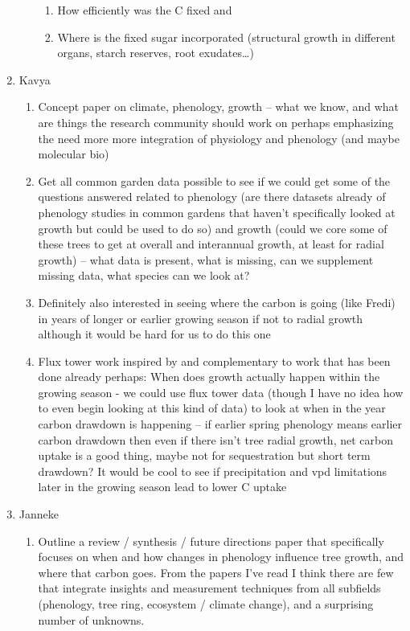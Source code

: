 \documentclass[11pt,letter]{article}
\begin{document}
\begin{enumerate}
\begin{enumerate}
\begin{enumerate}
\item  How efficiently was the C fixed and
\item  Where is the fixed sugar incorporated (structural growth in different organs, starch reserves, root exudates…)
\end{enumerate}
\end{enumerate}
\item Kavya
\begin{enumerate}
\item Concept paper on climate, phenology, growth – what we know, and what are things the research community should work on perhaps emphasizing the need more more integration of physiology and phenology (and maybe molecular bio)
\item Get all common garden data possible to see if we could get some of the questions answered related to phenology (are there datasets already of phenology studies in common gardens that haven't specifically looked at growth but could be used to do so) and growth (could we core some of these trees to get at overall and interannual growth, at least for radial growth) – what data is present, what is missing, can we supplement missing data, what species can we look at?
\item Definitely also interested in seeing where the carbon is going (like Fredi) in years of longer or earlier growing season if not to radial growth although it would be hard for us to do this one
\item Flux tower work inspired by and complementary to work that has been done already perhaps: When does growth actually happen within the growing season - we could use flux tower data (though I have no idea how to even begin looking at this kind of data) to look at when in the year carbon drawdown is happening – if earlier spring phenology means earlier carbon drawdown then even if there isn’t tree radial growth, net carbon uptake is a good thing, maybe not for sequestration but short term drawdown? It would be cool to see if precipitation and vpd limitations later in the growing season lead to lower C uptake
\end{enumerate}
\item Janneke
\begin{enumerate}
\item Outline a review / synthesis / future directions paper that specifically focuses on when and how changes in phenology influence tree growth, and where that carbon goes. From the papers I've read I think there are few that integrate insights and measurement techniques from all subfields (phenology, tree ring, ecosystem / climate change), and a surprising number of unknowns. 

\end{enumerate}
\end{enumerate}
\end{document}
